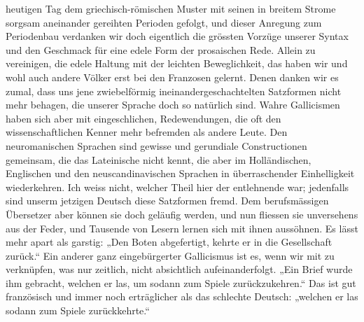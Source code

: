 {heutigen Tag \label{fp.266} dem griechisch-römischen Muster mit seinen in breitem Strome  sorgsam aneinander gereihten Perioden gefolgt, und dieser Anregung zum Periodenbau verdanken wir doch eigentlich die grössten Vorzüge unserer Syntax und den Geschmack für eine edele Form der prosaischen Rede. Allein  zu vereinigen, die edele Haltung mit der leichten Beweglichkeit, das haben wir und wohl auch andere Völker erst bei den Franzosen gelernt. Denen danken wir es zumal, dass uns jene zwiebelförmig ineinandergeschachtelten Satzformen nicht mehr behagen, die unserer Sprache doch so natürlich sind. Wahre Gallicismen haben sich aber  mit eingeschlichen, Redewendungen, die oft den wissenschaftlichen Kenner mehr befremden als andere Leute. Den neuromanischen Sprachen sind gewisse  und gerundiale Constructionen gemeinsam, die das Lateinische nicht kennt, die aber im Holländischen, Englischen und den neuscandinavischen Sprachen in überraschender Einhelligkeit wiederkehren. Ich weiss nicht, welcher Theil hier der entlehnende war; jedenfalls sind unserm jetzigen Deutsch diese Satzformen fremd. Dem berufsmässigen Übersetzer aber können sie doch geläufig werden, und nun fliessen sie unversehens aus der Feder, und Tausende von Lesern lernen sich mit ihnen aussöhnen. Es lässt mehr apart als garstig: „Den Boten abgefertigt, kehrte er in die Gesellschaft zurück.“ Ein anderer ganz eingebürgerter Gallicismus ist es, wenn wir mit  zu verknüpfen, was nur zeitlich, nicht absichtlich aufeinanderfolgt. „Ein Brief wurde ihm gebracht, welchen er las, um sodann zum Spiele zurückzukehren.“ Das ist gut französisch und immer noch erträglicher als das schlechte Deutsch: „welchen er las  sodann zum Spiele zurückkehrte.“ \largerpage[2]

}
